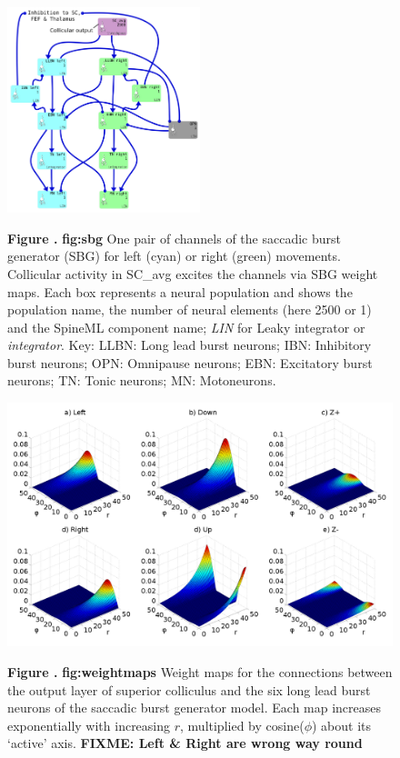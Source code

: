 \documentclass{frontiersSCNS}
\begin{document}
\begin{figure}[h!]
\begin{center}
\includegraphics[width=0.5\textwidth]{./figures/Brain_Stem_1channel.png}
\end{center}
\textbf{\label{fig:sbg} Figure .}
{ \textbf{fig:sbg} One pair of channels of the saccadic burst
generator (SBG) for left (cyan) or right (green) movements. Collicular
activity in SC\_avg excites the channels via SBG weight maps. Each box
represents a neural population and shows the population name, the
number of neural elements (here 2500 or 1) and the SpineML component
name; \emph{LIN} for Leaky integrator or \emph{integrator}. Key: LLBN:
Long lead burst neurons; IBN: Inhibitory burst neurons; OPN: Omnipause
neurons; EBN: Excitatory burst neurons; TN: Tonic neurons; MN:
Motoneurons.}
\end{figure}

\begin{figure}[htb!]
\begin{center}
\includegraphics[width=\textwidth]{./figures/weightmaps.png}
\end{center}
\textbf{\label{fig:weightmaps} Figure .}
{ \textbf{fig:weightmaps} Weight maps for the connections between the
output layer of superior colliculus and the six long lead burst
neurons of the saccadic burst generator model. Each map increases
exponentially with increasing $r$, multiplied by cosine($\phi$) about
its `active' axis. \textbf{FIXME: Left \& Right are wrong way round}}
\end{figure}
\end{document}
